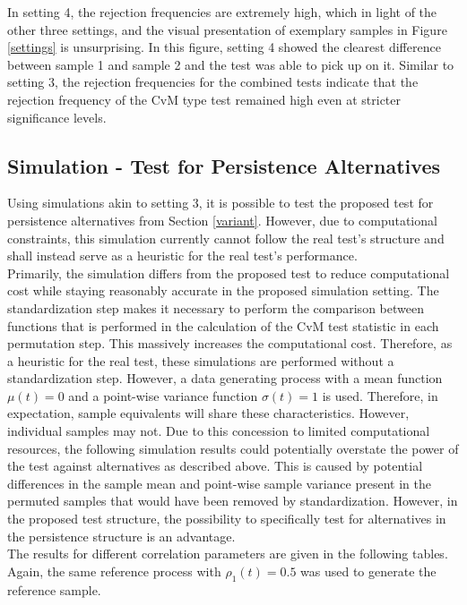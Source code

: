 \documentclass[12pt, a4paper]{article}
\theoremstyle{MAstyle} \newtheorem{assumption}{Assumption}[section]
\theoremstyle{MAstyle} \newtheorem{definition}{Definition}[section]
\theoremstyle{MAstyle} \newtheorem{theorem}{Theorem}[section]
\begin{document}
		In setting 4, the rejection frequencies are extremely high, which in light of the other three settings, and the visual presentation of exemplary samples in Figure \ref{settings} is unsurprising. In this figure, setting 4 showed the clearest difference between  sample 1 and sample 2 and the test was able to pick up on it. Similar to setting 3, the rejection frequencies for the combined tests indicate that the rejection frequency of the CvM type test remained high even at stricter significance levels.
	
		\subsection{Simulation - Test for Persistence Alternatives}\label{sim_persistence}
		Using simulations akin to setting 3, it is possible to test the proposed test for persistence alternatives from Section \ref{variant}. However, due to computational constraints, this simulation currently cannot follow the real test's structure and shall instead serve as a heuristic for the real test's performance. \\
		Primarily, the simulation differs from the proposed test to reduce computational cost while staying reasonably accurate in the proposed simulation setting. The standardization step makes it necessary to perform the comparison between functions that is performed in the calculation of the CvM test statistic in each permutation step. This massively increases the computational cost. Therefore, as a heuristic for the real test, these simulations are performed without a standardization step. However, a data generating process with a mean function $\mu(t) = 0$ and a point-wise variance function $\sigma(t) = 1$ is used. Therefore, in expectation, sample equivalents will share these characteristics. However, individual samples may not.
		Due to this concession to limited computational resources, the following simulation results could potentially overstate the power of the test against alternatives as described above. This is caused by potential differences in the sample mean and point-wise sample variance present in the permuted samples that would have been removed by standardization. 
		However, in the proposed test structure, the possibility to specifically test for alternatives in the persistence structure is an advantage.\\
	
		The results for different correlation parameters are given in the following tables. Again, the same reference process with $\rho_1(t) = 0.5$ was used to generate the reference sample.
\end{document}
